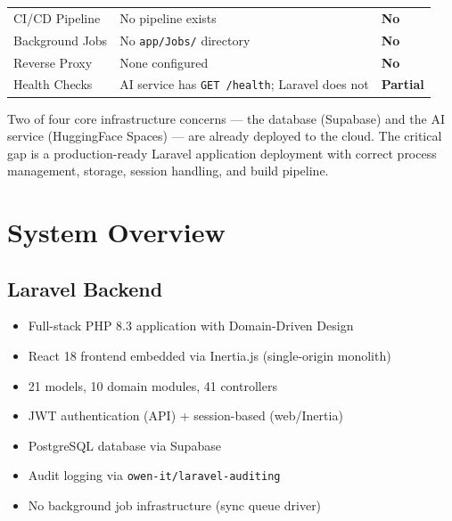 \documentclass[12pt,a4paper]{report}
\begin{document}
\begin{longtable}{L{4cm} L{5.5cm} C{2.5cm}}
    CI/CD Pipeline &
    No pipeline exists &
    \textcolor{dangerred}{\textbf{No}} \\[4pt]

    Background Jobs &
    No \texttt{app/Jobs/} directory &
    \textcolor{dangerred}{\textbf{No}} \\[4pt]

    Reverse Proxy &
    None configured &
    \textcolor{dangerred}{\textbf{No}} \\[4pt]

    Health Checks &
    AI service has \texttt{GET /health}; Laravel does not &
    \textcolor{warningorange}{\textbf{Partial}} \\

\end{longtable}

\begin{infobox}
    Two of four core infrastructure concerns — the database (Supabase)
    and the AI service (HuggingFace Spaces) — are already deployed to
    the cloud. The critical gap is a production-ready Laravel
    application deployment with correct process management, storage,
    session handling, and build pipeline.
\end{infobox}

\section{System Overview}

\subsection{Laravel Backend}

\begin{itemize}[leftmargin=1.5em]
    \item Full-stack PHP 8.3 application with Domain-Driven Design
    \item React 18 frontend embedded via Inertia.js (single-origin monolith)
    \item 21 models, 10 domain modules, 41 controllers
    \item JWT authentication (API) + session-based (web/Inertia)
    \item PostgreSQL database via Supabase
    \item Audit logging via \texttt{owen-it/laravel-auditing}
    \item No background job infrastructure (sync queue driver)
\end{itemize}
\end{document}

